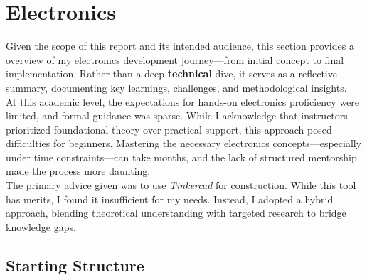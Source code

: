 \documentclass{article}
\begin{document}
\section{Electronics}
Given the scope of this report and its intended audience, this section provides a overview of my electronics development journey---from initial concept to final implementation. Rather than a deep \textbf{technical} dive, it serves as a reflective summary, documenting key learnings, challenges, and methodological insights.\\[8pt]
At this academic level, the expectations for hands-on electronics proficiency were limited, and formal guidance was sparse. While I acknowledge that instructors prioritized foundational theory over practical support, this approach posed difficulties for beginners. Mastering the necessary electronics concepts---especially under time constraints---can take months, and the lack of structured mentorship made the process more daunting.\\[8pt]
The primary advice given was to use \textit{Tinkercad} for construction. While this tool has merits, I found it insufficient for my needs. Instead, I adopted a hybrid approach, blending theoretical understanding with targeted research to bridge knowledge gaps.
\vspace{-0.4em}
\subsection{Starting Structure}
\end{document}
